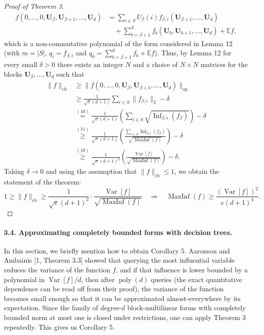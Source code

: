 \documentclass[10pt,a4paper]{article}
\begin{document}
\begin{proof}[Proof of Theorem 3]
\begin{align*}
f(0,\ldots,0,\mathbf U_\beta,\mathbf U_{\beta+1},\ldots,\mathbf U_d)
&=\sum_{i\in S}U_\beta(i)f_{\beta,i}(\mathbf U_{\beta+1},\ldots,\mathbf U_d)\\
&\quad+\sum_{b=\beta+1}^df_b(\mathbf U_b,\mathbf U_{b+1},\ldots,\mathbf U_d)+\mathbb Ef,
\end{align*}
which is a non-commutative polynomial of the form considered in Lemma 12 (with $m=|S|$, $q_i=f_{\beta,i}$ and $q_0=\sum_{b=\beta+1}^df_b+\mathbb Ef$). Thus, by Lemma 12 for every small $\delta>0$ there exists an integer $N$ and a choice of $N\times N$ matrices for the blocks $\mathbf U_\beta,\ldots,\mathbf U_d$ such that
\begin{align*}
\|f\|_{\mathrm{cb}}&\geq\|f(0,\ldots,0,\mathbf U_\beta,\mathbf U_{\beta+1},\ldots,\mathbf U_d)\|_{\mathrm{op}}\\
&\geq\frac1{\sqrt e(d+1)}\sum_{i\in S}\|f_{\beta,i}\|_2-\delta\\
&\overset{(10)}=\frac1{\sqrt e(d+1)}\left(\sum_{i\in S}\sqrt{\operatorname{Inf}_{\beta,i}(f_\beta)}\right)-\delta\\
&\overset{(11)}\geq\frac1{\sqrt e(d+1)}\left(\frac{\sum_{i\in S}\operatorname{Inf}_{\beta,i}(f_\beta)}{\sqrt{\operatorname{MaxInf}(f)}}\right)-\delta\\
&\overset{(10)}\geq\frac1{\sqrt e(d+1)^2}\left(\frac{\operatorname{Var}[f]}{\sqrt{\operatorname{MaxInf}(f)}}\right)-\delta.
\end{align*}
Taking $\delta\to0$ and using the assumption that $\|f\|_{\mathrm{cb}}\leq1$, we obtain the statement of the theorem:
\[1\geq\|f\|_{\mathrm{cb}}\geq\frac1{\sqrt e(d+1)^2}\cdot\frac{\operatorname{Var}[f]}{\sqrt{\operatorname{MaxInf}(f)}}\quad\Longrightarrow\quad\operatorname{MaxInf}(f)\geq\frac{(\operatorname{Var}[f])^2}{e(d+1)^4}.\]
\end{proof}
\paragraph{3.4. Approximating completely bounded forms with decision trees.}
In this section, we briefly mention how to obtain Corollary 5. Aaronson and Ambainis [1, Theorem 3.3] showed that querying the most influential variable reduces the variance of the function $f$, and if that influence is lower bounded by a polynomial in $\operatorname{Var}[f]/d$, then after $\operatorname{poly}(d)$ queries (the exact quantitative dependence can be read off from their proof), the variance of the function becomes small enough so that it can be approximated almost-everywhere by its expectation. Since the family of degree-$d$ block-multilinear forms with completely bounded norm at most one is closed under restrictions, one can apply Theorem 3 repeatedly. This gives us Corollary 5.
\end{document}
